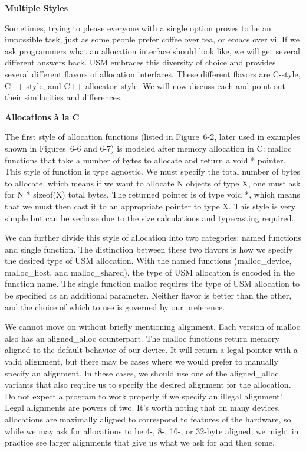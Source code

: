 \hspace*{\fill} \par %
\textbf{Multiple Styles}

Sometimes, trying to please everyone with a single option proves to be an impossible task, just as some people prefer coffee over tea, or emacs over vi. If we ask programmers what an allocation interface should look like, we will get several different answers back. USM embraces this diversity of choice and provides several different flavors of allocation interfaces. These different flavors are C-style, C++-style, and C++ allocator–style. We will now discuss each and point out their similarities and differences.\par

\hspace*{\fill} \par %
\textbf{Allocations à la C}

The first style of allocation functions (listed in Figure 6-2, later used in examples shown in Figures 6-6 and 6-7) is modeled after memory allocation in C: malloc functions that take a number of bytes to allocate and return a void * pointer. This style of function is type agnostic. We must specify the total number of bytes to allocate, which means if we want to allocate N objects of type X, one must ask for N * sizeof(X) total bytes. The returned pointer is of type void *, which means that we must then cast it to an appropriate pointer to type X. This style is very simple but can be verbose due to the size calculations and typecasting required.\par

We can further divide this style of allocation into two categories: named functions and single function. The distinction between these two flavors is how we specify the desired type of USM allocation. With the named functions (malloc\_device, malloc\_host, and malloc\_shared), the type of USM allocation is encoded in the function name. The single function malloc requires the type of USM allocation to be specified as an additional parameter. Neither flavor is better than the other, and the choice of which to use is governed by our preference.\par

We cannot move on without briefly mentioning alignment. Each version of malloc also has an aligned\_alloc counterpart. The malloc functions return memory aligned to the default behavior of our device. It will return a legal pointer with a valid alignment, but there may be cases where we would prefer to manually specify an alignment. In these cases, we should use one of the aligned\_alloc variants that also require us to specify the desired alignment for the allocation. Do not expect a program to work properly if we specify an illegal alignment! Legal alignments are powers of two. It’s worth noting that on many devices, allocations are maximally aligned to correspond to features of the hardware, so while we may ask for allocations to be 4-, 8-, 16-, or 32-byte aligned, we might in practice see larger alignments that give us what we ask for and then some.\par

